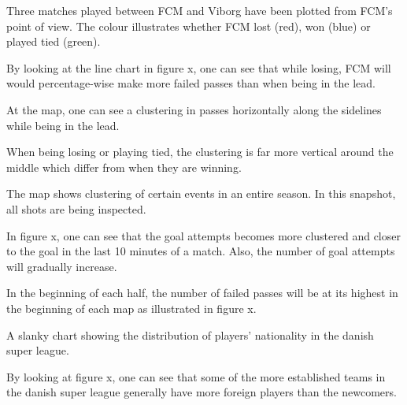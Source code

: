 \documentclass[11pt]{article}
\begin{document}
 
	

Three matches played between FCM and Viborg have been plotted from FCM's point of view. The colour illustrates whether FCM lost (red), won (blue) or played tied (green).

By looking at the line chart in figure x, one can see that while losing, FCM will would percentage-wise make more failed passes than when being in the lead.

At the map, one can see a clustering in passes horizontally along the sidelines while being in the lead.

 When being losing or playing tied, the clustering is far more vertical around the middle which differ from when they are winning.


The map shows clustering of certain events in an entire season. In this snapshot, all shots are being inspected.

In figure x, one can see that the goal attempts becomes more clustered and closer to the goal in the last 10 minutes of a match. Also, the number of goal attempts will gradually increase.

In the beginning of each half, the number of failed passes will be at its highest in the beginning of each map as illustrated in figure x.



A slanky chart showing the distribution of players' nationality in the danish super league.

By looking at figure x, one can see that some of the more established teams in the danish super league generally have more foreign players than the newcomers.
	
\end{document}
